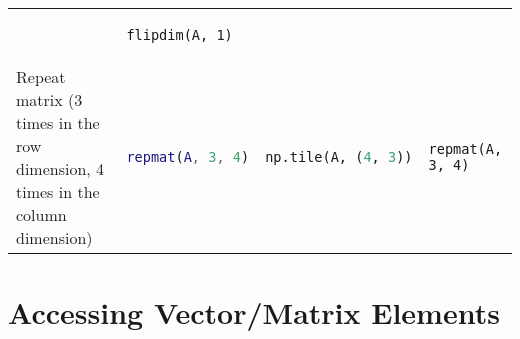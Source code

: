 \begin{tabular}[]{@{}llll@{}}
\begin{minipage}[t]{0.20\columnwidth}
\end{minipage} & \begin{minipage}[t]{0.20\columnwidth}\raggedright
\begin{lstlisting}
flipdim(A, 1)
\end{lstlisting}

\end{minipage}\tabularnewline
\begin{minipage}[t]{0.24\columnwidth}\raggedright
Repeat matrix (3 times in the row dimension, 4 times in the column
dimension)
\end{minipage} & \begin{minipage}[t]{0.23\columnwidth}\raggedright
\begin{lstlisting}[language=Matlab]
repmat(A, 3, 4)
\end{lstlisting}

\end{minipage} & \begin{minipage}[t]{0.20\columnwidth}\raggedright
\begin{lstlisting}[language=Python]
np.tile(A, (4, 3))
\end{lstlisting}

\end{minipage} & \begin{minipage}[t]{0.20\columnwidth}\raggedright
\begin{lstlisting}
repmat(A, 3, 4)
\end{lstlisting}

\end{minipage}\tabularnewline
\bottomrule
\end{tabular}

\section{Accessing Vector/Matrix
Elements}\label{accessing-vectormatrix-elements}

